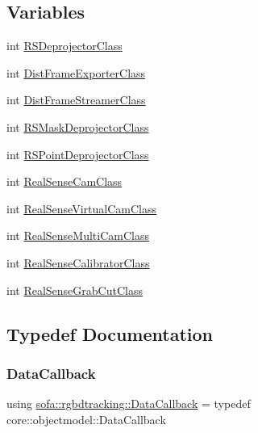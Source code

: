 \subsection*{Variables}
\begin{DoxyCompactItemize}
\item 
int \hyperlink{namespacesofa_1_1rgbdtracking_ac3f6d225dbe5a6782bfbb716bc3940e9}{R\+S\+Deprojector\+Class}
\item 
int \hyperlink{namespacesofa_1_1rgbdtracking_a1b9f5fecf5affbe66747355df84f3eba}{Dist\+Frame\+Exporter\+Class}
\item 
int \hyperlink{namespacesofa_1_1rgbdtracking_a7d552ae238bb3e3f0323220bd43f38d5}{Dist\+Frame\+Streamer\+Class}
\item 
int \hyperlink{namespacesofa_1_1rgbdtracking_a585e4b070b41993d28e4c727bcd0b836}{R\+S\+Mask\+Deprojector\+Class}
\item 
int \hyperlink{namespacesofa_1_1rgbdtracking_a615e1879a9190fb07f0669c146ecc164}{R\+S\+Point\+Deprojector\+Class}
\item 
int \hyperlink{namespacesofa_1_1rgbdtracking_a2430eec90f6511f570bb58f6ce29e745}{Real\+Sense\+Cam\+Class}
\item 
int \hyperlink{namespacesofa_1_1rgbdtracking_a30f0b3b59f71c94fac5ceebea2f6cf4b}{Real\+Sense\+Virtual\+Cam\+Class}
\item 
int \hyperlink{namespacesofa_1_1rgbdtracking_a5f7b935ae843053a8c1c4aec898c37fb}{Real\+Sense\+Multi\+Cam\+Class}
\item 
int \hyperlink{namespacesofa_1_1rgbdtracking_a5a0fbb78b29abf28ac16247f111a57f6}{Real\+Sense\+Calibrator\+Class}
\item 
int \hyperlink{namespacesofa_1_1rgbdtracking_ac0fc03382c0bfe23d9d73d844ce7ee91}{Real\+Sense\+Grab\+Cut\+Class}
\end{DoxyCompactItemize}


\subsection{Typedef Documentation}
\mbox{\label{namespacesofa_1_1rgbdtracking_a00834a9204a667746fef9a402ccbfb55}} 
\subsubsection{\texorpdfstring{Data\+Callback}{DataCallback}}
{\footnotesize\ttfamily using \hyperlink{namespacesofa_1_1rgbdtracking_a00834a9204a667746fef9a402ccbfb55}{sofa\+::rgbdtracking\+::\+Data\+Callback} = typedef core\+::objectmodel\+::\+Data\+Callback}



